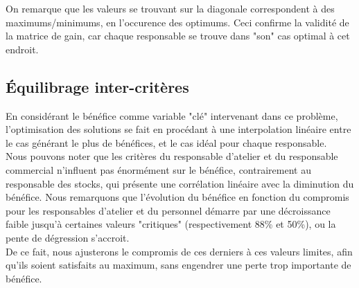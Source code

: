 \documentclass{article}
\begin{document}
On remarque que les valeurs se trouvant sur la diagonale correspondent à des
maximums/minimums, en l'occurence des optimums. Ceci confirme la validité de
la matrice de gain, car chaque responsable se trouve dans "son" cas optimal
à cet endroit.

\subsection{Équilibrage inter-critères}

En considérant le bénéfice comme variable "clé" intervenant dans ce problème,
l'optimisation des solutions se fait en procédant à une interpolation linéaire
entre le cas générant le plus de bénéfices, et le cas idéal pour chaque
responsable. \\


Nous pouvons noter que les critères du responsable d'atelier et du responsable
commercial n'influent pas énormément sur le bénéfice, contrairement au
responsable des stocks, qui présente une corrélation linéaire avec la
diminution du bénéfice.
Nous remarquons que l'évolution du bénéfice en fonction du compromis pour les
responsables d'atelier et du personnel démarre par une décroissance faible
jusqu'à certaines valeurs "critiques" (respectivement 88\% et 50\%), ou la
pente de dégression s'accroit. \\

De ce fait, nous ajusterons le compromis de ces derniers à ces valeurs limites,
afin qu'ils soient satisfaits au maximum, sans engendrer une perte trop
importante de bénéfice. \\

\end{document}
